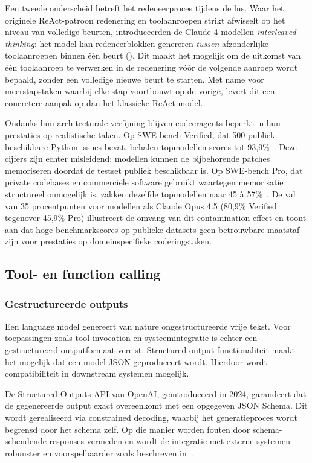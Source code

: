 Een tweede onderscheid betreft het redeneerproces tijdens de lus. Waar het originele ReAct-patroon redenering en toolaanroepen strikt afwisselt op het niveau van volledige beurten, introduceerden de Claude 4-modellen \textit{interleaved thinking}: het model kan redeneerblokken genereren \textit{tussen} afzonderlijke toolaanroepen binnen één beurt (\cite{anthropic_adaptivethinking}). Dit maakt het mogelijk om de uitkomst van één toolaanroep te verwerken in de redenering vóór de volgende aanroep wordt bepaald, zonder een volledige nieuwe beurt te starten. Met name voor meerstapstaken waarbij elke stap voortbouwt op de vorige, levert dit een concretere aanpak op dan het klassieke ReAct-model.


Ondanks hun architecturale verfijning blijven codeeragents beperkt in hun prestaties op realistische taken. Op SWE-bench Verified, dat 500 publiek beschikbare Python-issues bevat, behalen topmodellen scores tot 93,9\%~\cite{scale_swebench_pro}. Deze cijfers zijn echter misleidend: modellen kunnen de bijbehorende patches memoriseren doordat de testset publiek beschikbaar is. Op SWE-bench Pro, dat private codebases en commerciële software gebruikt waartegen memorisatie structureel onmogelijk is, zakken dezelfde topmodellen naar 45 à 57\%~\cite{scale_swebench_pro}. De val van 35 procentpunten voor modellen als Claude Opus 4.5 (80,9\% Verified tegenover 45,9\% Pro) illustreert de omvang van dit contamination-effect en toont aan dat hoge benchmarkscores op publieke datasets geen betrouwbare maatstaf zijn voor prestaties op domeinspecifieke coderingstaken.

\subsection{Tool- en function calling}\label{subsec:toolcalling}

\subsubsection{Gestructureerde outputs}

Een language model genereert van nature ongestructureerde vrije tekst. Voor toepassingen zoals tool invocation en systeemintegratie is echter een gestructureerd outputformaat vereist. Structured output functionaliteit maakt het mogelijk dat een model JSON geproduceert wordt. Hierdoor wordt compatibiliteit in downstream systemen mogelijk.

De Structured Outputs API van OpenAI, geïntroduceerd in 2024, garandeert dat de gegenereerde output exact overeenkomt met een opgegeven JSON Schema. Dit wordt gerealiseerd via constrained decoding, waarbij het generatieproces wordt begrensd door het schema zelf. Op die manier worden fouten door schema-schendende responses vermeden en wordt de integratie met externe systemen robuuster en voorspelbaarder zoals beschreven in~\cite{schick2023toolformer}.

